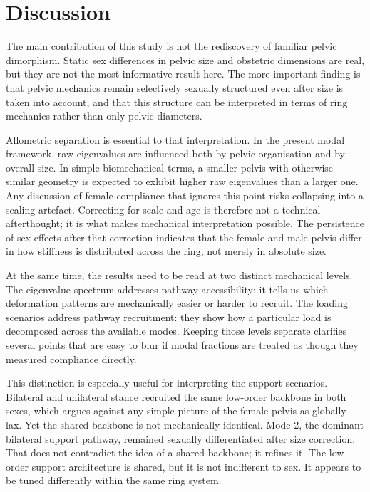 \documentclass[openacc]{rsproca_new}
\begin{document}
\section{Discussion}
The main contribution of this study is not the rediscovery of familiar pelvic dimorphism. Static sex differences in pelvic size and obstetric dimensions are real, but they are not the most informative result here. The more important finding is that pelvic mechanics remain selectively sexually structured even after size is taken into account, and that this structure can be interpreted in terms of ring mechanics rather than only pelvic diameters.

Allometric separation is essential to that interpretation. In the present modal framework, raw eigenvalues are influenced both by pelvic organisation and by overall size. In simple biomechanical terms, a smaller pelvis with otherwise similar geometry is expected to exhibit higher raw eigenvalues than a larger one. Any discussion of female compliance that ignores this point risks collapsing into a scaling artefact. Correcting for scale and age is therefore not a technical afterthought; it is what makes mechanical interpretation possible. The persistence of sex effects after that correction indicates that the female and male pelvis differ in how stiffness is distributed across the ring, not merely in absolute size.

At the same time, the results need to be read at two distinct mechanical levels. The eigenvalue spectrum addresses pathway accessibility: it tells us which deformation patterns are mechanically easier or harder to recruit. The loading scenarios address pathway recruitment: they show how a particular load is decomposed across the available modes. Keeping those levels separate clarifies several points that are easy to blur if modal fractions are treated as though they measured compliance directly.

This distinction is especially useful for interpreting the support scenarios. Bilateral and unilateral stance recruited the same low-order backbone in both sexes, which argues against any simple picture of the female pelvis as globally lax. Yet the shared backbone is not mechanically identical. Mode 2, the dominant bilateral support pathway, remained sexually differentiated after size correction. That does not contradict the idea of a shared backbone; it refines it. The low-order support architecture is shared, but it is not indifferent to sex. It appears to be tuned differently within the same ring system.
\end{document}
